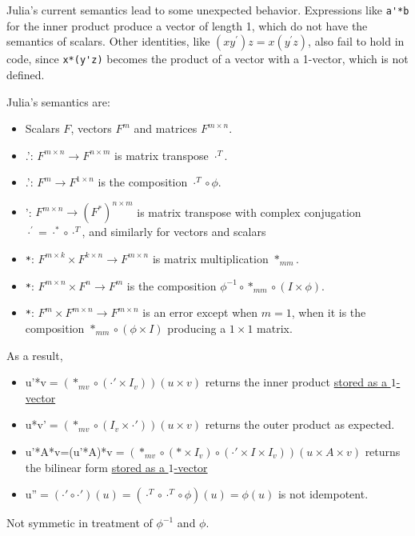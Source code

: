 Julia's current semantics lead to some unexpected behavior. Expressions
like \verb`a'*b` for the inner product produce a vector of length
1, which do not have the semantics of scalars. Other identities, like
$(xy^{\prime})z=x(y^{\prime}z)$, also fail to hold in code, since
\verb`x*(y'z)` becomes the product of a vector with a 1-vector, which
is not defined.

Julia's semantics are:
\begin{itemize}
\item Scalars $F$, vectors $F^{m}$ and matrices $F^{m\times n}$.
\item .': $F^{m\times n}\rightarrow F^{n\times m}$ is matrix transpose
$\cdot^{T}$.
\item .': $F^{m}\rightarrow F^{1\times n}$ is the composition $\cdot^{T}\circ\phi$.
\item ': $F^{m\times n}\rightarrow\left(F^{*}\right)^{n\times m}$ is matrix
transpose with complex conjugation $\cdot^{\prime}=\cdot^{*}\circ\cdot^{T}$,
and similarly for vectors and scalars
\item \verb`*`: $F^{m\times k}\times F^{k\times n}\rightarrow F^{m\times n}$
is matrix multiplication $*_{mm}$.
\item \verb`*`: $F^{m\times n}\times F^{n}\rightarrow F^{m}$ is the composition
$\phi^{-1}\circ*_{mm}\circ\left(I\times\phi\right)$.
\item \verb`*`: $F^{m}\times F^{m\times n}\rightarrow F^{m\times n}$ is
an error except when $m=1$, when it is the composition $*_{mm}\circ\left(\phi\times I\right)$
producing a $1\times1$ matrix.
\end{itemize}
As a result,
\begin{itemize}
\item u'{*}v$=\left(*_{mv}\circ\left(\cdot'\times I_{v}\right)\right)\left(u\times v\right)$
returns the inner product \uline{stored as a $1$-vector}
\item u{*}v'$=\left(*_{mv}\circ\left(I_{v}\times\cdot'\right)\right)\left(u\times v\right)$
returns the outer product as expected.
\item u'{*}A{*}v=(u'{*}A){*}v$=\left(*_{mv}\circ\left(*\times I_{v}\right)\circ\left(\cdot'\times I\times I_{v}\right)\right)\left(u\times A\times v\right)$
returns the bilinear form \uline{stored as a $1$-vector}
\item u''$=\left(\cdot'\circ\cdot'\right)\left(u\right)=\left(\cdot^{T}\circ\cdot^{T}\circ\phi\right)\left(u\right)=\phi\left(u\right)$
is not idempotent.
\end{itemize}
Not symmetic in treatment of $\phi^{-1}$ and $\phi$.


